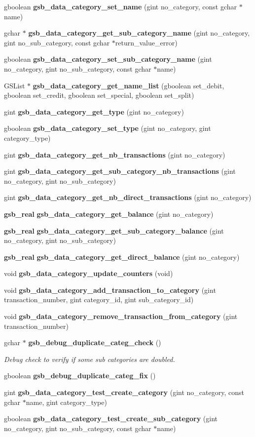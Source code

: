 \begin{DoxyCompactItemize}
\item 
gboolean {\bf gsb\_\-data\_\-category\_\-set\_\-name} (gint no\_\-category, const gchar $\ast$name)
\item 
gchar $\ast$ {\bf gsb\_\-data\_\-category\_\-get\_\-sub\_\-category\_\-name} (gint no\_\-category, gint no\_\-sub\_\-category, const gchar $\ast$return\_\-value\_\-error)
\item 
gboolean {\bf gsb\_\-data\_\-category\_\-set\_\-sub\_\-category\_\-name} (gint no\_\-category, gint no\_\-sub\_\-category, const gchar $\ast$name)
\item 
GSList $\ast$ {\bf gsb\_\-data\_\-category\_\-get\_\-name\_\-list} (gboolean set\_\-debit, gboolean set\_\-credit, gboolean set\_\-special, gboolean set\_\-split)
\item 
gint {\bf gsb\_\-data\_\-category\_\-get\_\-type} (gint no\_\-category)
\item 
gboolean {\bf gsb\_\-data\_\-category\_\-set\_\-type} (gint no\_\-category, gint category\_\-type)
\item 
gint {\bf gsb\_\-data\_\-category\_\-get\_\-nb\_\-transactions} (gint no\_\-category)
\item 
gint {\bf gsb\_\-data\_\-category\_\-get\_\-sub\_\-category\_\-nb\_\-transactions} (gint no\_\-category, gint no\_\-sub\_\-category)
\item 
gint {\bf gsb\_\-data\_\-category\_\-get\_\-nb\_\-direct\_\-transactions} (gint no\_\-category)
\item 
{\bf gsb\_\-real} {\bf gsb\_\-data\_\-category\_\-get\_\-balance} (gint no\_\-category)
\item 
{\bf gsb\_\-real} {\bf gsb\_\-data\_\-category\_\-get\_\-sub\_\-category\_\-balance} (gint no\_\-category, gint no\_\-sub\_\-category)
\item 
{\bf gsb\_\-real} {\bf gsb\_\-data\_\-category\_\-get\_\-direct\_\-balance} (gint no\_\-category)
\item 
void {\bf gsb\_\-data\_\-category\_\-update\_\-counters} (void)
\item 
void {\bf gsb\_\-data\_\-category\_\-add\_\-transaction\_\-to\_\-category} (gint transaction\_\-number, gint category\_\-id, gint sub\_\-category\_\-id)
\item 
void {\bf gsb\_\-data\_\-category\_\-remove\_\-transaction\_\-from\_\-category} (gint transaction\_\-number)
\item 
gchar $\ast$ {\bf gsb\_\-debug\_\-duplicate\_\-categ\_\-check} ()
\begin{DoxyCompactList}\small\item\em Debug check to verify if some sub categories are doubled. \item\end{DoxyCompactList}\item 
gboolean {\bf gsb\_\-debug\_\-duplicate\_\-categ\_\-fix} ()
\item 
gint {\bf gsb\_\-data\_\-category\_\-test\_\-create\_\-category} (gint no\_\-category, const gchar $\ast$name, gint category\_\-type)
\item 
gboolean {\bf gsb\_\-data\_\-category\_\-test\_\-create\_\-sub\_\-category} (gint no\_\-category, gint no\_\-sub\_\-category, const gchar $\ast$name)
\end{DoxyCompactItemize}
